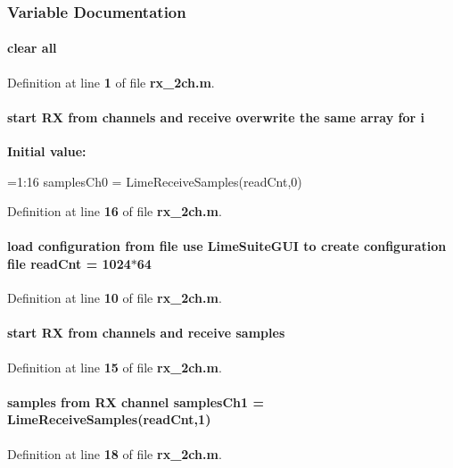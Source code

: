 \subsubsection{Variable Documentation}
\paragraph[{all}]{\setlength{\rightskip}{0pt plus 5cm}clear all}\label{rx__2ch_8m_a4603254d9990f7140c024d51302d1a8f}


Definition at line {\bf 1} of file {\bf rx\+\_\+2ch.\+m}.

\paragraph[{i}]{\setlength{\rightskip}{0pt plus 5cm}start RX from channels and receive overwrite the same array for i}\label{rx__2ch_8m_a8e676834fe962ba0f9e1149e7978a27d}
{\bfseries Initial value\+:}
\begin{DoxyCode}
=1:16
    samplesCh0 = LimeReceiveSamples(readCnt,0)
\end{DoxyCode}


Definition at line {\bf 16} of file {\bf rx\+\_\+2ch.\+m}.

\paragraph[{read\+Cnt}]{\setlength{\rightskip}{0pt plus 5cm}load configuration from {\bf file} use Lime\+Suite\+G\+UI to create configuration {\bf file} read\+Cnt = 1024$\ast$64}\label{rx__2ch_8m_a3a328aa3127ae72c8296ed0ea4897f99}


Definition at line {\bf 10} of file {\bf rx\+\_\+2ch.\+m}.

\paragraph[{samples}]{\setlength{\rightskip}{0pt plus 5cm}start RX from channels and receive samples}\label{rx__2ch_8m_a2fb40cd30885c423c71ec49523b86546}


Definition at line {\bf 15} of file {\bf rx\+\_\+2ch.\+m}.

\paragraph[{samples\+Ch1}]{ {\bf samples} from RX channel samples\+Ch1 = Lime\+Receive\+Samples({\bf read\+Cnt},1)}\label{rx__2ch_8m_ada04640f01123a1e8896c7a72f099e6c}


Definition at line {\bf 18} of file {\bf rx\+\_\+2ch.\+m}.

